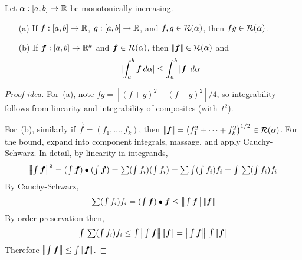 \begin{cor}
Let \(\alpha:[a,b]\to\mathbb{R}\) be monotonically increasing.
\begin{enumerate}[itemsep=0pt]
\item[(a)] If \(f:[a,b]\to\mathbb{R}\), \(g:[a,b]\to\mathbb{R}\), and \(f,g\in\mathcal{R}(\alpha)\), then \(fg\in\mathcal{R}(\alpha)\).
\item[(b)] If \(\boldsymbol{f}:[a,b]\to\mathbb{R}^k\) and \(\boldsymbol{f}\in\mathcal{R}(\alpha)\), then \(\left|\!\left|{\boldsymbol{f}}\right|\!\right|\in\mathcal{R}(\alpha)\) and
\[|{\int_a^b\boldsymbol{f}\,d\alpha}|\le\int_a^b|{\boldsymbol{f}}|\,d\alpha\]
\end{enumerate}
\end{cor}
\begin{proof}[Proof idea]
For~(a), note \(fg=[(f+g)^2-(f-g)^2]/4\), so integrability follows from linearity and integrability of composites (with~\(t^2\)).

For~(b), similarly if \(\vec{f}=(f_1,\ldots,f_k)\), then \(\left|\!\left|{\boldsymbol{f}}\right|\!\right|=\bigl(f_1^2+\cdots+f_k^2\bigr)^{1/2}\in\mathcal{R}(\alpha)\). For the bound, expand into component integrals, massage, and apply Cauchy-Schwarz. In detail, by linearity in integrands,
\[\textstyle\left|\!\left|{\int\boldsymbol{f}}\right|\!\right|^2
=(\int\boldsymbol{f})\bullet(\int\boldsymbol{f})
=\sum(\int f_i)(\int f_i)
=\sum\int(\int f_i)f_i
=\int\,\sum(\int f_i)f_i\]
By Cauchy-Schwarz,
\[\textstyle\sum(\int f_i)f_i=(\int\boldsymbol{f})\bullet\boldsymbol{f}\le\left|\!\left|{\int\boldsymbol{f}}\right|\!\right|\left|\!\left|{\boldsymbol{f}}\right|\!\right|\]
By order preservation then,
\[\textstyle\int\,\sum(\int f_i)f_i\le\int\norm{\int\vec{f}}\norm{\vec{f}}=\norm{\int\vec{f}}\,\int\norm{\vec{f}}\]
Therefore \(\left|\!\left|{\int\boldsymbol{f}}\right|\!\right|\le\int\left|\!\left|{\boldsymbol{f}}\right|\!\right|\).
\end{proof}

